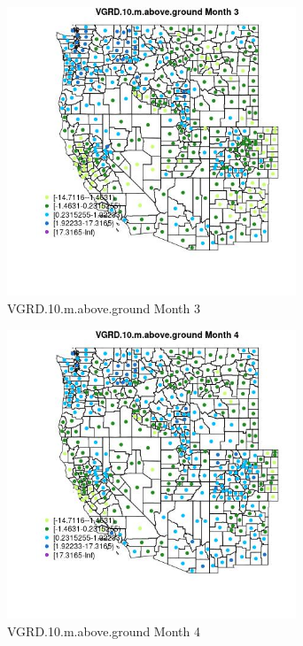 \begin{figure} 
\centering  
\includegraphics[width=0.77\textwidth]{Code_Outputs/df_report_ML_predictors_CountyCentroid_Locations_Dates_2008-01-01to2018-12-31_MapObsMo3VGRD10maboveground.jpg} 
\caption{\label{fig:df_report_ML_predictors_CountyCentroid_Locations_Dates_2008-01-01to2018-12-31MapObsMo3VGRD10maboveground}VGRD.10.m.above.ground Month 3} 
\end{figure} 
 

\begin{figure} 
\centering  
\includegraphics[width=0.77\textwidth]{Code_Outputs/df_report_ML_predictors_CountyCentroid_Locations_Dates_2008-01-01to2018-12-31_MapObsMo4VGRD10maboveground.jpg} 
\caption{\label{fig:df_report_ML_predictors_CountyCentroid_Locations_Dates_2008-01-01to2018-12-31MapObsMo4VGRD10maboveground}VGRD.10.m.above.ground Month 4} 
\end{figure} 
 

